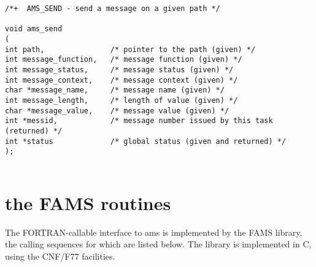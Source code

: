 \begin{verbatim}
/*+  AMS_SEND - send a message on a given path */

void ams_send
(
int path,               /* pointer to the path (given) */
int message_function,   /* message function (given) */
int message_status,     /* message status (given) */
int message_context,    /* message context (given) */
char *message_name,     /* message name (given) */
int message_length,     /* length of value (given) */
char *message_value,    /* message value (given) */
int *messid,            /* message number issued by this task (returned) */
int *status             /* global status (given and returned) */
);


\end{verbatim}

\section {the FAMS routines}

The FORTRAN-callable interface to ams is implemented by the FAMS library,
the calling sequences for which are listed below. The library is
implemented in C, using the CNF/F77 facilities.


